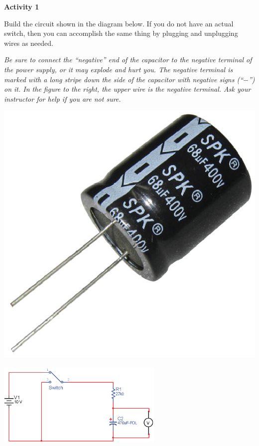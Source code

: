 \textbf{Activity 1}

Build the circuit shown in the diagram below.  If you do not have an actual switch, then you can accomplish the same thing by plugging and unplugging wires as needed.

\begin{minipage}{0.83\textwidth}
\begin{newboxed}
\vspace{-0.2 in}
\textit{Be sure to connect the “negative” end of the capacitor to the negative terminal of the power supply, or it may explode and hurt you.  The negative terminal is marked with a long stripe down the side of the capacitor with negative signs (``$-$'') on it.  In the figure to the right, the upper wire is the negative terminal. Ask your instructor for help if you are not sure.}
\vspace{-0.1 in}
\end{newboxed}
\end{minipage}
\begin{minipage}{0.17\textwidth}
\includegraphics[width=1.0\textwidth]{rc_circuits/capacitor.eps}
\end{minipage}

\begin{center}
\vspace{-0.3 in}
\includegraphics[width=0.6\textwidth]{rc_circuits/circuit_diagram.eps}
\vspace{-0.2 in}
\end{center}

